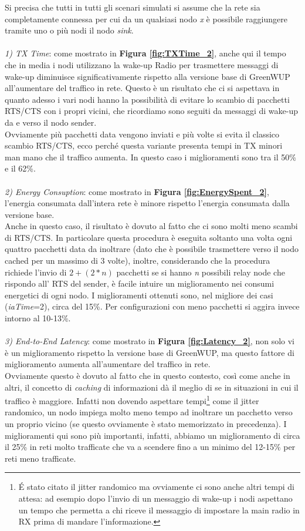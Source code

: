 Si precisa che tutti in tutti gli scenari simulati si assume che la rete sia completamente connessa per cui da un qualsiasi nodo \textit{x} è possibile raggiungere tramite uno o più nodi il nodo \textit{sink}.
\\\\
\textit{1) TX Time}: come mostrato in \textbf{Figura \ref{fig:TXTime_2}}, anche qui il tempo che in media i nodi utilizzano la wake-up Radio per trasmettere messaggi di wake-up diminuisce significativamente rispetto alla versione base di GreenWUP all'aumentare del traffico in rete. Questo è un risultato che ci si aspettava in quanto adesso i vari nodi hanno la possibilità di evitare lo scambio di pacchetti RTS/CTS con i propri vicini, che ricordiamo sono seguiti da messaggi di wake-up da e verso il nodo sender.\\
Ovviamente più pacchetti data vengono inviati e più volte si evita il classico scambio RTS/CTS, ecco perché questa variante presenta tempi in TX minori man mano che il traffico aumenta. In questo caso i miglioramenti sono tra il 50\% e il 62\%.
\\\\
\textit{2) Energy Consuption}: come mostrato in \textbf{Figura \ref{fig:EnergySpent_2}}, l'energia consumata dall'intera rete è minore rispetto l'energia consumata dalla versione base.\\
Anche in questo caso, il risultato è dovuto al fatto che ci sono molti meno scambi di RTS/CTS. In particolare questa procedura è eseguita soltanto una volta ogni quattro pacchetti data da inoltrare (dato che è possibile trasmettere verso il nodo cached per un massimo di 3 volte), inoltre, considerando che la procedura richiede l'invio di \(2 + ( 2 * n)\) pacchetti se si hanno \textit{n} possibili relay node che rispondo all' RTS del sender, è facile intuire un miglioramento nei consumi energetici di ogni nodo. I miglioramenti ottenuti sono, nel migliore dei casi (\textit{iaTime}=2), circa del 15\%. Per configurazioni con meno pacchetti si aggira invece intorno al 10-13\%.
\\\\
\textit{3) End-to-End Latency}: come mostrato in \textbf{Figura \ref{fig:Latency_2}}, non solo vi è un miglioramento rispetto la versione base di GreenWUP, ma questo fattore di miglioramento aumenta all'aumentare del traffico in rete.\\
Ovviamente questo è dovuto al fatto che in questo contesto, così come anche in altri, il concetto di \textit{caching} di informazioni dà il meglio di se in situazioni in cui il traffico è maggiore. Infatti non dovendo aspettare tempi\footnote{\'E stato citato il jitter randomico ma ovviamente ci sono anche altri tempi di attesa: ad esempio dopo l'invio di un messaggio di wake-up i nodi aspettano un tempo che permetta a chi riceve il messaggio di impostare la main radio in RX prima di mandare l'informazione.} come il jitter randomico, un nodo impiega molto meno tempo ad inoltrare un pacchetto verso un proprio vicino (se questo ovviamente è stato memorizzato in precedenza). I miglioramenti qui sono più importanti, infatti, abbiamo un miglioramento di circa il 25\% in reti molto trafficate che va a scendere fino a un minimo del 12-15\% per reti meno trafficate. 
